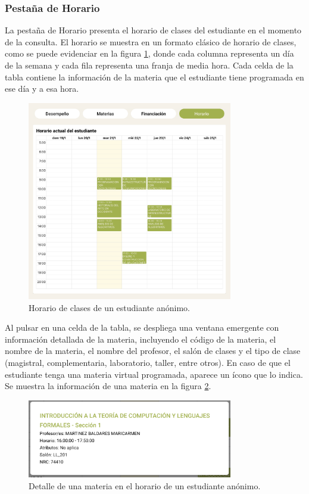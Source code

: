 \subsubsection{Pestaña de Horario}

La pestaña de Horario presenta el horario de clases del estudiante en el momento de la consulta. El horario se muestra en un formato clásico de horario de clases, como se puede evidenciar en la figura \ref{fig:horario}, donde cada columna representa un día de la semana y cada fila representa una franja de media hora. Cada celda de la tabla contiene la información de la materia que el estudiante tiene programada en ese día y a esa hora. 

\begin{figure}[H]
  \centering
  \includegraphics[width=0.8\textwidth]{img/nes/horario.png}
  \caption{Horario de clases de un estudiante anónimo.}
  \label{fig:horario}
\end{figure}

Al pulsar en una celda de la tabla, se despliega una ventana emergente con información detallada de la materia, incluyendo el código de la materia, el nombre de la materia, el nombre del profesor, el salón de clases y el tipo de clase (magistral, complementaria, laboratorio, taller, entre otros). En caso de que el estudiante tenga una materia virtual programada, aparece un ícono que lo indica. Se muestra la información de una materia en la figura \ref{fig:detalle_horario}.

\begin{figure}[H]
  \centering
  \includegraphics[width=0.8\textwidth]{img/nes/detalle_horario.png}
  \caption{Detalle de una materia en el horario de un estudiante anónimo.}
  \label{fig:detalle_horario}
\end{figure}

